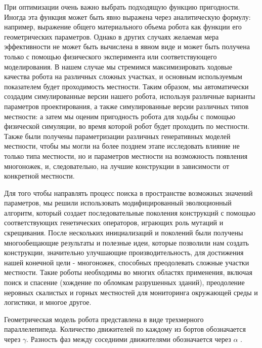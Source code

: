 При оптимизации очень важно выбрать подходящую функцию пригодности. Иногда эта функция может быть явно выражена через аналитическую формулу: например, выражение общего материального объема робота как функции его геометрических параметров. Однако в других случаях желаемая мера эффективности не может быть вычислена в явном виде и может быть получена только с помощью физического эксперимента или соответствующего моделирования. В нашем случае мы стремимся максимизировать ходовые качества робота на различных сложных участках, и основным используемым показателем будет проходимость местности. Таким образом, мы автоматически создадим симулированные версии нашего робота, используя различные варианты параметров проектирования, а также симулированные версии различных типов местности: а затем мы оценим пригодность робота для ходьбы с помощью физической симуляции, во время которой робот будет проходить по местности. Также были получены параметризации различных генеративных моделей местности, чтобы мы могли на более позднем этапе исследовать влияние не только типа местности, но и параметров местности на возможность появления многоножек, и, следовательно, на лучшие конструкции в зависимости от конкретной местности.

Для того чтобы направлять процесс поиска в пространстве возможных значений параметров, мы решили использовать модифицированный эволюционный алгоритм, который создает последовательные поколения конструкций с помощью соответствующих генетических операторов, играющих роль мутаций и скрещивания. После нескольких инициализаций и поколений были получены многообещающие результаты и полезные идеи, которые позволили нам создать конструкции, значительно улучшающие производительность, для достижения нашей конечной цели - многоножек, способных преодолевать сложные участки местности. Такие роботы необходимы во многих областях применения, включая поиск и спасение (хождение по обломкам разрушенных зданий), преодоление неровных скалистых и горных местностей для мониторинга окружающей среды и логистики, и многое другое\cite{bulichevOptimizationCentipedeRobot2017}.

Геометрическая модель робота представлена в виде трехмерного параллелепипеда. Количество движителей по каждому из бортов обозначается через $\gamma$. Разность фаз между соседними движителями обозначается через  $\alpha$ .

